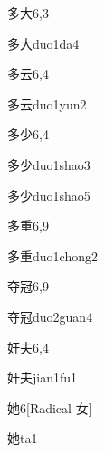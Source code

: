 \begin{entry}{多大}{6,3}
  \begin{phonetics}{多大}{duo1da4}
  \end{phonetics}
\end{entry}

\begin{entry}{多云}{6,4}
  \begin{phonetics}{多云}{duo1yun2}
  \end{phonetics}
\end{entry}

\begin{entry}{多少}{6,4}
  \begin{phonetics}{多少}{duo1shao3}
  \end{phonetics}
  \begin{phonetics}{多少}{duo1shao5}
  \end{phonetics}
\end{entry}

\begin{entry}{多重}{6,9}
  \begin{phonetics}{多重}{duo1chong2}
  \end{phonetics}
\end{entry}

\begin{entry}{夺冠}{6,9}
  \begin{phonetics}{夺冠}{duo2guan4}
  \end{phonetics}
\end{entry}

\begin{entry}{奸夫}{6,4}
  \begin{phonetics}{奸夫}{jian1fu1}
  \end{phonetics}
\end{entry}

\begin{entry}{她}{6}[Radical 女]
  \begin{phonetics}{她}{ta1}
  \end{phonetics}
\end{entry}


